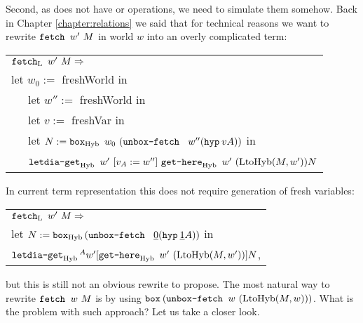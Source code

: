 Second, as \langHyb{} does not have \fetche{} or \gete{} operations, we need to simulate them somehow. Back in Chapter \ref{chapter:relations} we said that for technical reasons we want to rewrite $\fetch{w'}{M}$ in world $w$ into an overly complicated term:

\begin{center}
\begin{tabular}{ l }
$\fetch[\tL]{w'}{M} =>$\\
let  $w_0 := $ freshWorld in\\
~~~let  $w'' := $ freshWorld in\\
~~~let  $v := $ freshVar in\\
~~~let  $N := \bbox[\tHyb]{w_0}{(\unboxfetch {w''} {(\hyp{v}A)})}$ in\\
~~~$\letdiaget[\tHyb]{w'}{v}A{w''} {\gethere[\tHyb]{w'}{(\funLtoHyb{M}{w'})}} {N} $\\
\end{tabular}
\end{center}

In current term representation this does not require generation of fresh variables:
\begin{center}
\begin{tabular}{ l }
$\fetch[\tL]{w'}{M} =>$\\
let  $N := \bboxb[\tHyb]{(\unboxfetch {\bvar{0}} {(\hyp{\bvar{1}}A)})}$ in\\
$\letdiagetb[\tHyb]A{w'}{\gethere[\tHyb]{w'}{(\funLtoHyb{M}{w'})}} {N}$,\\
\end{tabular}
\end{center}
but this is still not an obvious rewrite to propose. The most natural way to rewrite $\fetch{w}{M}$ is by using $\bboxb{(\unboxfetch{w}{(\funLtoHyb{M}{w})})}$. What is the problem with such approach? Let us take a closer look.\\

